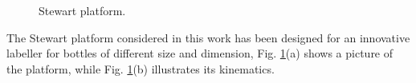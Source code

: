 \documentclass[]{interact}
\theoremstyle{plain}%
\theoremstyle{definition}
\theoremstyle{remark}
\begin{document}
\begin{figure}
\centering
{}\hspace{5pt}
\caption{Stewart platform.} \label{Fig:Stewart_platform_picture}
\end{figure}
The Stewart platform considered in this work has been designed for an innovative labeller for bottles of different size and dimension, Fig. \ref{Fig:Stewart_platform_picture}(a) shows a picture of the platform, while Fig. \ref{Fig:Stewart_platform_picture}(b) illustrates its kinematics.
\end{document}
